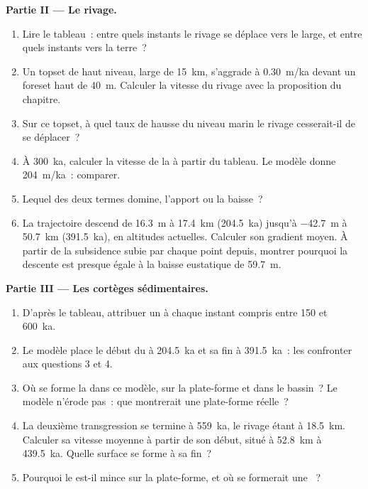 \begin{problem}
\medskip\noindent\textbf{Partie II --- Le rivage.}
\begin{enumerate}[resume]
\item Lire le tableau~: entre quels instants le rivage se déplace vers le large,
  et entre quels instants vers la terre~?
\item Un topset de haut niveau, large de \qty{15}{km}, s'aggrade à \qty{0.30}{m/ka}
  devant un foreset haut de \qty{40}{m}. Calculer la vitesse du
  rivage avec la proposition du chapitre.
\item Sur ce topset, à quel taux de hausse du niveau marin le rivage cesserait-il de se déplacer~?
\item À \qty{300}{ka}, calculer la vitesse de la  à partir
  du tableau. Le modèle donne \qty{204}{m/ka}~: comparer.
\item Lequel des deux termes domine, l'apport ou la baisse~?
\item La trajectoire descend de \qty{16.3}{m} à \qty{17.4}{km}
  (\qty{204.5}{ka}) jusqu'à \qty{-42.7}{m} à \qty{50.7}{km}
  (\qty{391.5}{ka}), en altitudes actuelles. Calculer son gradient moyen.
  À partir de la subsidence subie par chaque point depuis, montrer pourquoi la descente
  est presque égale à la baisse eustatique de \qty{59.7}{m}.
\end{enumerate}

\medskip\noindent\textbf{Partie III --- Les cortèges sédimentaires.}
\begin{enumerate}[resume]
\item D'après le tableau, attribuer un  à chaque instant compris entre 150 et
  \qty{600}{ka}.
\item Le modèle place le début du  à \qty{204.5}{ka}
  et sa fin à \qty{391.5}{ka}~: les confronter aux questions 3 et 4.
\item Où se forme la  dans ce modèle, sur la plate-forme et
  dans le bassin~? Le modèle n'érode pas~: que montrerait une plate-forme réelle~?
\item La deuxième transgression se termine à \qty{559}{ka}, le rivage étant à
  \qty{18.5}{km}. Calculer sa vitesse moyenne à partir de son début, situé à \qty{52.8}{km}
  à \qty{439.5}{ka}. Quelle surface se forme à sa fin~?
\item Pourquoi le  est-il mince sur la plate-forme, et où se formerait
  une ~?
\end{enumerate}


\end{problem}
